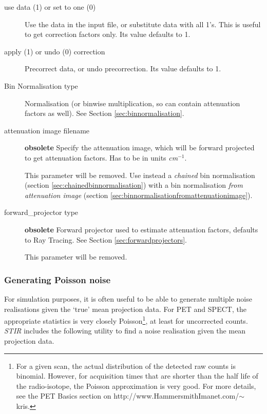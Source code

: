 \documentclass{article}
\begin{document}
\begin{description}

\item[use data (1) or set to one (0)]
Use the data in the input file, or substitute data with all 1's. 
This is useful to get correction factors only. Its value defaults 
to 1.

\item[apply (1) or undo (0) correction]
Precorrect data, or undo precorrection. Its value defaults to 
1.

\item[Bin Normalisation type]
Normalisation (or binwise multiplication, so can contain attenuation 
factors as well). See Section \ref{sec:binnormalisation}.


\item[attenuation image filename] \textbf{obsolete}
Specify the attenuation image, which will be forward projected 
to get attenuation factors. Has to be in units \textit{cm}$^{\mathit{-1}}$.


This parameter will be removed. Use instead a \textit{chained} 
bin normalisation (section \ref{sec:chainedbinnormalisation}) 
with a bin normalisation 
\textit{from attenuation image} (section \ref{sec:binnormalisationfromattenuationimage}).


\item[forward\_projector type] \textbf{obsolete}
Forward projector used to estimate attenuation factors, defaults 
to Ray Tracing. See Section \ref{sec:forwardprojectors}.

This parameter will be removed.
\end{description}


\subsubsection{
Generating Poisson noise}

For simulation purposes, it is often useful to be able to generate 
multiple noise realisations given the `true' mean projection data. 
For PET and SPECT, the appropriate statistics is very closely 
Poisson\footnote{{\small For a given scan, the actual distribution of 
the detected raw counts is binomial. However, for acquisition 
times that are shorter than the half life of the radio-isotope, 
the Poisson approximation is very good. For more details, see 
the PET Basics section on http://www.HammersmithImanet.com/\ensuremath{\sim}kris.}}, 
at least for uncorrected counts. \textit{STIR} includes the following 
utility to find a noise realisation given the mean projection 
data.
\end{document}
